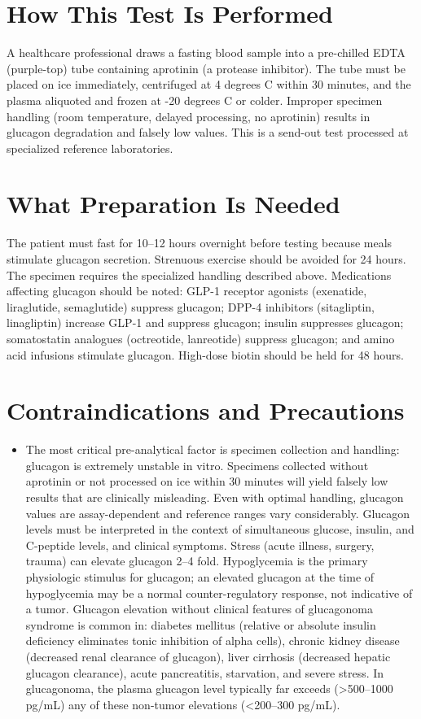 \section*{How This Test Is Performed}
A healthcare professional draws a fasting blood sample into a pre-chilled EDTA (purple-top) tube containing aprotinin (a protease inhibitor). The tube must be placed on ice immediately, centrifuged at 4 degrees C within 30 minutes, and the plasma aliquoted and frozen at -20 degrees C or colder. Improper specimen handling (room temperature, delayed processing, no aprotinin) results in glucagon degradation and falsely low values. This is a send-out test processed at specialized reference laboratories.

\section*{What Preparation Is Needed}
The patient must fast for 10--12 hours overnight before testing because meals stimulate glucagon secretion. Strenuous exercise should be avoided for 24 hours. The specimen requires the specialized handling described above. Medications affecting glucagon should be noted: GLP-1 receptor agonists (exenatide, liraglutide, semaglutide) suppress glucagon; DPP-4 inhibitors (sitagliptin, linagliptin) increase GLP-1 and suppress glucagon; insulin suppresses glucagon; somatostatin analogues (octreotide, lanreotide) suppress glucagon; and amino acid infusions stimulate glucagon. High-dose biotin should be held for 48 hours.

\section*{Contraindications and Precautions}
\begin{itemize}
  \item The most critical pre-analytical factor is specimen collection and handling: glucagon is extremely unstable in vitro. Specimens collected without aprotinin or not processed on ice within 30 minutes will yield falsely low results that are clinically misleading. Even with optimal handling, glucagon values are assay-dependent and reference ranges vary considerably. Glucagon levels must be interpreted in the context of simultaneous glucose, insulin, and C-peptide levels, and clinical symptoms. Stress (acute illness, surgery, trauma) can elevate glucagon 2--4 fold. Hypoglycemia is the primary physiologic stimulus for glucagon; an elevated glucagon at the time of hypoglycemia may be a normal counter-regulatory response, not indicative of a tumor. Glucagon elevation without clinical features of glucagonoma syndrome is common in: diabetes mellitus (relative or absolute insulin deficiency eliminates tonic inhibition of alpha cells), chronic kidney disease (decreased renal clearance of glucagon), liver cirrhosis (decreased hepatic glucagon clearance), acute pancreatitis, starvation, and severe stress. In glucagonoma, the plasma glucagon level typically far exceeds (>500--1000 pg/mL) any of these non-tumor elevations (<200--300 pg/mL).
\end{itemize}
